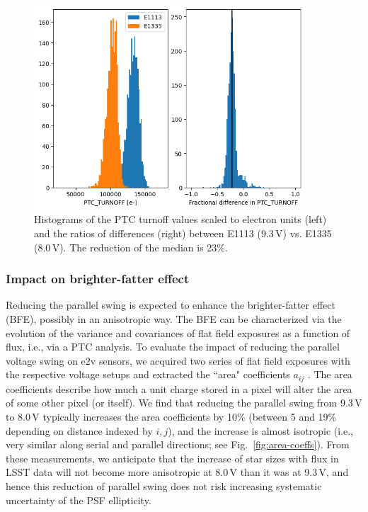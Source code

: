 \begin{figure}[ht]
\begin{centering}
\includegraphics[width=0.9\textwidth]{figures/PtcTurnoffRatio.png}
\end{centering}
\caption{Histograms of the PTC turnoff values scaled to electron units (left) and the ratios of
differences (right) between E1113 (9.3\,V) vs. E1335 (8.0\,V). The reduction of
the median is 23\%.}
\label{fig:ptc-turnoff}
\end{figure}



\subsubsection{Impact on brighter-fatter effect}\label{impact-on-brighter-fatter-effect}

Reducing the parallel swing is expected to enhance the brighter-fatter
effect (BFE), possibly in an anisotropic way. The BFE can be
characterized via the evolution of the variance and covariances of
flat field exposures as a function of flux, i.e., via a PTC analysis. To evaluate the
impact of reducing the parallel voltage swing on e2v sensors, we
acquired two series of flat field exposures with the respective voltage
setups and extracted the ``area" coefficients $a_{ij}$
\citep[Equation (1) in][]{2023A&A...670A.118A}.
The area coefficients describe how much a unit charge stored in
a pixel will alter the area of some other pixel (or itself). We find that
reducing the parallel swing from 9.3\,V to 8.0\,V typically increases the
area coefficients by 10\% (between 5 and 19\% depending on distance indexed by $i,j$),
and the increase is almost isotropic (i.e., very similar along serial and parallel
directions; see Fig.~\ref{fig:area-coeffs}). From these measurements, we anticipate that the increase of
star sizes with flux in LSST data will not become more anisotropic at 8.0\,V than it was at
9.3\,V, and hence this reduction of parallel swing does not 
risk increasing systematic uncertainty of the PSF ellipticity.

